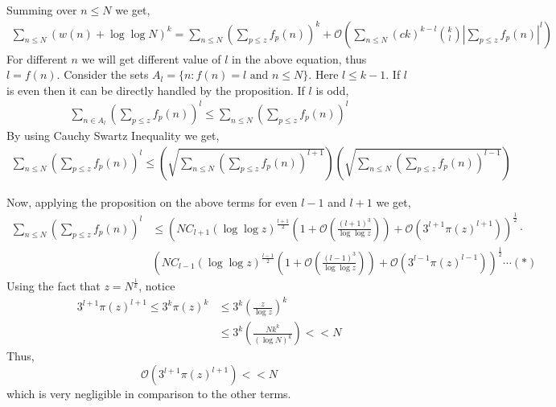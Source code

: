 \documentclass{beamer}
\numberwithin{theorem}{section}
\theoremstyle{definition}
\begin{document}
\begin{frame}[shrink=15]
Summing over $n\le N$ we get,
\begin{align*}
    \sum_{n\le N}(w(n)+\log\log N)^{k}=\sum_{n\le N}\left(\sum_{p\le z}f_p(n)\right)^k+\mathcal{O}\left(\sum_{n\le N}(ck)^{k-l}{k \choose l}\left|\sum_{p\le z}f_p(n)\right|^l\right)
\end{align*}
    For different $n$ we will get different value of $l$ in the above equation, thus $l=f(n)$. Consider the sets $A_l=\{n: f(n)=l \text{ and } n\le N\}.$
    Here $l\le k-1$. If $l$ is even then it can be directly handled by the proposition. If $l$ is odd,
    \begin{align*}
        \sum_{n\in A_l}\left(\sum_{p\le z}f_p(n)\right)^l\le \sum_{n\le N}\left(\sum_{p\le z}f_p(n)\right)^l
    \end{align*}
    By using Cauchy Swartz Inequality we get,
    \begin{align*}
        \sum_{n\le N}\left(\sum_{p\le z}f_p(n)\right)^l \le \left(\sqrt{\sum_{n\le N}\left(\sum_{p\le z}f_p(n)\right)^{l+1}}\right) \left(\sqrt{\sum_{n\le N}\left(\sum_{p\le z}f_p(n)\right)^{l-1}}\right)
    \end{align*}
\end{frame}
\begin{frame}[shrink=20]
Now, applying the proposition on the above terms for even $l-1$ and $l+1$ we get,
\begin{align*}
    \sum_{n\le N}\left(\sum_{p\le z}f_p(n)\right)^l &\le \left(NC_{l+1}(\log\log z)^{\frac{l+1}{2}}\left(1+\mathcal{O}\left(\frac{(l+1)^3}{\log\log z}\right)\right)+\mathcal{O}(3^{l+1}\pi(z)^{l+1})\right)^{\frac{1}{2}}\cdot\\
    & \left(NC_{l-1}(\log\log z)^{\frac{l-1}{2}}\left(1+\mathcal{O}\left(\frac{(l-1)^3}{\log\log z}\right)\right)+\mathcal{O}(3^{l-1}\pi(z)^{l-1})\right)^{\frac{1}{2}}\cdots(*)
\end{align*}
    Using the fact that $z=N^{\frac{1}{k}}$, notice
    \begin{align*}
        3^{l+1}\pi(z)^{l+1}\le 3^k\pi(z)^k&\le 3^k\left(\frac{z}{\log z}\right)^k\\&\le 3^k\left(\frac{Nk^k}{(\log N)^k}\right)<<N
    \end{align*}
    Thus, 
    $$\mathcal{O}(3^{l+1}\pi(z)^{l+1})<<N$$
    which is very negligible in comparison to the other terms.
\end{frame}
\end{document}
